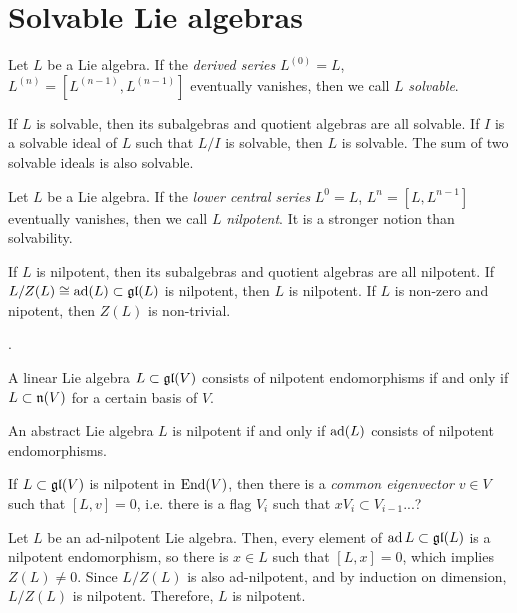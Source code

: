 \documentclass{../../large}
\begin{document}
\section{Solvable Lie algebras}


\begin{prb}
Let $L$ be a Lie algebra.
If the \emph{derived series} $L^{(0)}=L$, $L^{(n)}=[L^{(n-1)},L^{(n-1)}]$ eventually vanishes, then we call $L$ \emph{solvable}.

If $L$ is solvable, then its subalgebras and quotient algebras are all solvable.
If $I$ is a solvable ideal of $L$ such that $L/I$ is solvable, then $L$ is solvable.
The sum of two solvable ideals is also solvable.


Let $L$ be a Lie algebra.
If the \emph{lower central series} $L^0=L$, $L^n=[L,L^{n-1}]$ eventually vanishes, then we call $L$ \emph{nilpotent}.
It is a stronger notion than solvability.

If $L$ is nilpotent, then its subalgebras and quotient algebras are all nilpotent.
If $L/Z(L)\cong\operatorname{ad}(L)\subset\mathfrak{gl}(L)$ is nilpotent, then $L$ is nilpotent.
If $L$ is non-zero and nipotent, then $Z(L)$ is non-trivial.
\end{prb}

\begin{prb}
.
\begin{parts}
\item A linear Lie algebra $L\subset\mathfrak{gl}(V)$ consists of nilpotent endomorphisms if and only if $L\subset\mathfrak{n}(V)$ for a certain basis of $V$.
\item An abstract Lie algebra $L$ is nilpotent if and only if $\operatorname{ad}(L)$ consists of nilpotent endomorphisms.
\item If $L\subset\mathfrak{gl}(V)$ is nilpotent in $\operatorname{End}(V)$, then there is a \emph{common eigenvector} $v\in V$ such that $[L,v]=0$, i.e. there is a flag $V_i$ such that $xV_i\subset V_{i-1}$...?
\end{parts}
\end{prb}
\begin{pf}



Let $L$ be an ad-nilpotent Lie algebra.
Then, every element of $\operatorname{ad} L\subset\mathfrak{gl}(L)$ is a nilpotent endomorphism, so there is $x\in L$ such that $[L,x]=0$, which implies $Z(L)\ne0$.
Since $L/Z(L)$ is also ad-nilpotent, and by induction on dimension, $L/Z(L)$ is nilpotent.
Therefore, $L$ is nilpotent.
\end{pf}
\end{document}
